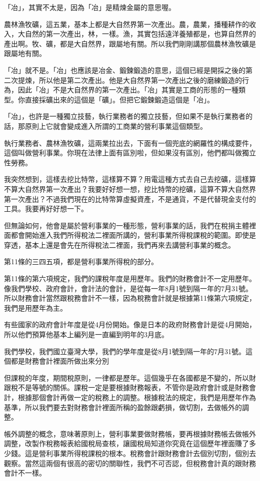 \documentclass[]{ctexbook}
\begin{document}
「冶」，其實不太是，因為「冶」是精煉金屬的意思喔。

農林漁牧礦，這五業，基本上都是大自然界第一次產出。農，農業，播種耕作的收入，大自然的第一次產出，林，一樣。漁，其實包括遠洋養殖都是，也算自然界的產出啊。牧、礦，都是大自然界，跟屬地有關。所以我們剛剛講那個農林漁牧礦是跟屬地有關。

「冶」就不是。「冶」也應該是冶金、鍛鍊鍛造的意思，這個已經是開採之後的第二次提煉，所以他是第二次產出。他是大自然界第一次產出之後的磨練鍛造的行為，因此「冶」不是大自然界的第一次產出。「冶」其實是工商的形態的一種類型。你直接採礦出來的這個是「礦」。但把它鍛鍊鍛造這個是「冶」。

「冶」，也許是一種獨立技藝，執行業務者的獨立技藝，但如果不是執行業務者的話，那原則上它就會變成進入所謂的工商業的營利事業這個類型。

執行業務者、農林漁牧礦，這兩業拉出去，下面有一個兜底的網羅性的構成要件，這個叫做營利事業。你現在法律上面有區別啦，但如果沒有區別，他們都叫做獨立性勞務。

我突然想到，這樣去挖比特幣，這樣算不算？用電這種方式去自己去挖礦，這樣算不算大自然界第一次產出？我要好好想一想，挖比特幣的挖礦，這算不算大自然界第一次產出？不過我們現在的比特幣算虛擬資產，不是通貨，不是代替現金支付的工具。我要再好好想一下。

但無論如何，他會是屬於營利事業的一種形態，營利事業的話，我們在稅捐主體裡面都會開始進入我們所得稅法二裡面所講的，營利事業所得稅課稅的範圍。即使是穿透，基本上還是會先在所得稅法二裡面，我們再來去講營利事業的概念。

第11條的三四五項，都是營利事業所得稅的部分。

第11條的第六項規定，我們的課稅年度是用歷年。我們的財務會計不一定用歷年。像我們學校、政府會計，會計法的會計，是從每一年8月1號到隔一年的7月31號。所以財務會計當然跟稅務會計不一樣，因為稅務會計就是根據第11條第六項規定，我們是用歷年為主。

有些國家的政府會計年度是從4月份開始。像是日本的政府財務會計是從4月開始，所以他們預算他基本上編列是一直編到明年的3月底。

我們學校，我們國立臺灣大學，我們的學年度是從8月1號到隔一年的7月31號。這個都是財務會計裡面所做出來分別

但課稅的年度，期間稅原則，一律都是歷年。這個幾乎在各國都是不變的，所以財跟稅不是等號的關係。課稅一定是要根據財務報表，不管你是政府會計或是財務會計，根據那個會計再做一定的稅務上的調整。根據稅法的規定，我們是用歷年作為基準，所以我們要去對財務會計裡面所稱的盈餘跟虧損，做切割，去做帳外的調整。

帳外調整的概念，意味著原則上，營利事業要做財務帳，要再根據財務帳去做帳外調整，改製作稅務報表給國稅局查核，讓國稅局知道你究竟在這個歷年裡面賺了多少錢。這是營利事業所得稅課稅的根本。稅務會計跟財務會計去個別切割，個別去觀察。當然這兩個有很高的密切的關聯性，我們不可否認，但稅務會計真的跟財務會計不一樣。
\end{document}
